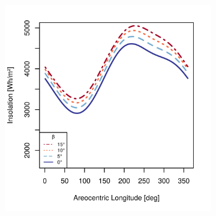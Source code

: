 \begin{figure}[h]
\captionsetup[subfigure]{justification=centering}
\vspace{-2ex}
\centering
    \setlength{\subfigureWidth}{0.50\textwidth}
    \setlength{\graphicsHeight}{60mm}
    \hypersetup{hidelinks=true}%
    \begin{subfigure}[t]{\subfigureWidth}
        \centering
            \includegraphics[height=\graphicsHeight]{sections/mars-solar-energy/mission-sites/plots/iani-chaos-solar-insolations-for-different-beta-inclinations.png}
            \label{fig:plot:sub:solar-insolations-for-different-beta-iani-chaos}
    \end{subfigure}\hfill
    \begin{subfigure}[t]{\subfigureWidth}
        \centering

\end{subfigure}
\end{figure}
